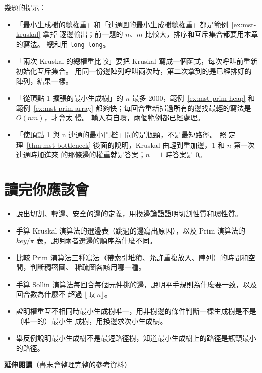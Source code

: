 幾題的提示：

\begin{itemize}
\item 「最小生成樹的總權重」和「連通圖的最小生成樹總權重」都是範例~\ref{ex:mst-kruskal} 拿掉
逐邊輸出；前一題的 $n$、$m$ 比較大，排序和互斥集合都要用本章的寫法。 總和用 \texttt{long
long}。
\item 「兩次 Kruskal 的總權重比較」要把 Kruskal 寫成一個函式，每次呼叫前重新初始化互斥集合。
用同一份邊陣列呼叫兩次時，第二次拿到的是已經排好的陣列，結果一樣。
\item 「從頂點 1 擴張的最小生成樹」的 $n$ 最多 $2000$，範例~\ref{ex:mst-prim-heap} 和
範例~\ref{ex:mst-prim-array} 都夠快；每回合重新掃過所有的邊找最輕的寫法是 $O(nm)$，才會太
慢。 輸入有自環，兩個範例都已經處理。
\item 「使頂點 1 與 n 連通的最小門檻」問的是瓶頸，不是最短路徑。 照
定理~\ref{thm:mst-bottleneck} 後面的說明，Kruskal 由輕到重加邊，$1$ 和 $n$ 第一次連通時加進來
的那條邊的權重就是答案；$n = 1$ 時答案是 $0$。
\end{itemize}

\section{讀完你應該會}
\label{sec:mst-checklist}

\begin{itemize}
\item 說出切割、輕邊、安全的邊的定義，用換邊論證證明切割性質和環性質。
\item 手算 Kruskal 演算法的選邊表（跳過的邊寫出原因），以及 Prim 演算法的 $\mathit{key}/\pi$
表，說明兩者選邊的順序為什麼不同。
\item 比較 Prim 演算法三種寫法（帶索引堆積、允許重複放入、陣列）的時間和空間，判斷稠密圖、
稀疏圖各該用哪一種。
\item 手算 Sollin 演算法每回合每個元件挑的邊，說明平手規則為什麼要一致，以及回合數為什麼不
超過 $\lfloor \lg n \rfloor$。
\item 證明權重互不相同時最小生成樹唯一，用非樹邊的條件判斷一棵生成樹是不是（唯一的）最小生
成樹，用換邊求次小生成樹。
\item 舉反例說明最小生成樹不是最短路徑樹，知道最小生成樹上的路徑是瓶頸最小的路徑。
\end{itemize}

\textbf{延伸閱讀}（書末會整理完整的參考資料）

